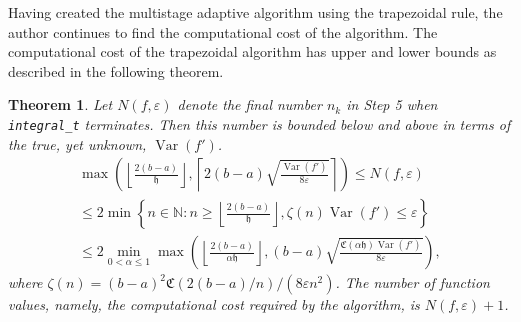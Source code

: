 \documentclass{iitthesis}
\DeclareMathOperator{\Var}{Var}
\newtheorem{theorem}{Theorem}
\theoremstyle{definition}
\theoremstyle{remark}
\begin{document}
Having created the multistage adaptive algorithm using the trapezoidal rule, the author continues to find the computational cost of the algorithm. The computational cost of the trapezoidal algorithm has upper and lower bounds as described in the following theorem.
\begin{theorem}\label{uppbndcosttrap}
    Let $N(f,\varepsilon)$ denote the final number $n_k$ in Step 5 when {\tt integral\_t} terminates. Then this number is bounded below and above in terms of the true, yet unknown, $\Var(f')$.
    \begin{multline}\label{uppbndcosttrapineq}
        \max\left(\left\lfloor\frac{2(b-a)}{\mathfrak{h}}\right\rfloor,\left\lceil2(b-a)\sqrt{\frac{\Var(f')}{8\varepsilon}}\right\rceil\right)\leq N(f,\varepsilon)\\ \leq 2\min\left\{n\in\mathbb{N}:n\geq\left\lfloor\frac{2(b-a)}{\mathfrak{h}}\right\rfloor,\zeta(n)\Var(f')\leq\varepsilon\right\}\\ \leq 2\min_{0<\alpha\leq1}\max\left(\left\lfloor\frac{2(b-a)}{\alpha\mathfrak{h}}\right\rfloor,(b-a)\sqrt{\frac{\mathfrak{C}(\alpha\mathfrak{h})\Var(f')}{8\varepsilon}}\right),
    \end{multline}
    where $\zeta(n)=(b-a)^2\mathfrak{C}(2(b-a)/n)/(8\varepsilon n^2)$. The number of function values, namely, the computational cost required by the algorithm, is $N(f,\varepsilon)+1$.
\end{theorem}
\end{document}
